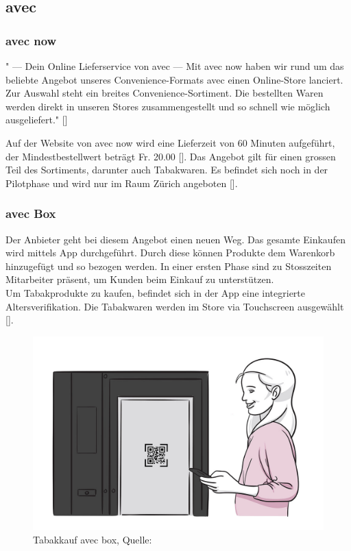 \subsection{avec}
\subsubsection{avec now}
" — Dein Online Lieferservice von avec —
 Mit avec now haben wir rund um das beliebte Angebot unseres Convenience-Formats avec einen Online-Store lanciert.
 Zur Auswahl steht ein breites Convenience-Sortiment. Die bestellten Waren werden direkt in unseren Stores zusammengestellt und so schnell wie möglich ausgeliefert." [\cite{avecNow}]
 
 Auf der Website von avec now wird eine Lieferzeit von 60 Minuten aufgeführt, der Mindestbestellwert beträgt Fr. 20.00 [\cite{avecNowMain}].
 Das Angebot gilt für einen grossen Teil des Sortiments, darunter auch Tabakwaren. Es befindet sich noch in der Pilotphase und wird nur im Raum Zürich angeboten [\cite{avecNowShipping}].
 
 \subsubsection{avec Box}\label{avecBox}
 Der Anbieter geht bei diesem Angebot einen neuen Weg. Das gesamte Einkaufen wird mittels App durchgeführt. Durch diese können Produkte dem Warenkorb hinzugefügt und so bezogen werden. In einer ersten Phase sind zu Stosszeiten Mitarbeiter präsent, um Kunden beim Einkauf zu unterstützen.  \\
 Um Tabakprodukte zu kaufen, befindet sich in der App eine integrierte Altersverifikation. Die Tabakwaren werden im Store via Touchscreen ausgewählt [\cite{avecBoxTabak}].
 \begin{figure}[H]
 	\centering
 	\includegraphics[width=1\textwidth]{images/tabakkaufAvecBox.jpg}
 	\caption[Tabakkauf avec box]{Tabakkauf avec box, Quelle: \cite{avecBoxTabak}}
 	\label{img: avec box tabakkauf}
 \end{figure}
 
